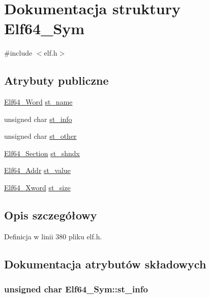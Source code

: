 \hypertarget{struct_elf64___sym}{\section{Dokumentacja struktury Elf64\-\_\-\-Sym}
\label{struct_elf64___sym}
}


{\ttfamily \#include $<$elf.\-h$>$}

\subsection*{Atrybuty publiczne}
\begin{DoxyCompactItemize}
\item 
\hyperlink{elf_8h_aa3aa1920ed115b7ef7e99716fece4401}{Elf64\-\_\-\-Word} \hyperlink{struct_elf64___sym_a4069f9db0c91ecc40bc2f4ddbdf28aff}{st\-\_\-name}
\item 
unsigned char \hyperlink{struct_elf64___sym_a9bbd53b13b0f1403d8369cbdd15df08c}{st\-\_\-info}
\item 
unsigned char \hyperlink{struct_elf64___sym_adba66dcdbe19ab3ecc24830a58549230}{st\-\_\-other}
\item 
\hyperlink{elf_8h_acc3d34d4258f3cf91184ff97a6f8dda1}{Elf64\-\_\-\-Section} \hyperlink{struct_elf64___sym_a942ca56d5692e290b23366388fc600e6}{st\-\_\-shndx}
\item 
\hyperlink{elf_8h_aeed51d08e3a950d637f8ec1f0cd4ef65}{Elf64\-\_\-\-Addr} \hyperlink{struct_elf64___sym_a9601295da4c2e81cc18c1f777609e1bf}{st\-\_\-value}
\item 
\hyperlink{elf_8h_a5447a48a3dae0bd24f606415268c6fe4}{Elf64\-\_\-\-Xword} \hyperlink{struct_elf64___sym_af5c72e0a09802b81e8087b303ec4d29f}{st\-\_\-size}
\end{DoxyCompactItemize}


\subsection{Opis szczegółowy}


Definicja w linii 380 pliku elf.\-h.



\subsection{Dokumentacja atrybutów składowych}
\hypertarget{struct_elf64___sym_a9bbd53b13b0f1403d8369cbdd15df08c}{
\subsubsection[{st\-\_\-info}]{\setlength{\rightskip}{0pt plus 5cm}unsigned char Elf64\-\_\-\-Sym\-::st\-\_\-info}}\label{struct_elf64___sym_a9bbd53b13b0f1403d8369cbdd15df08c}


